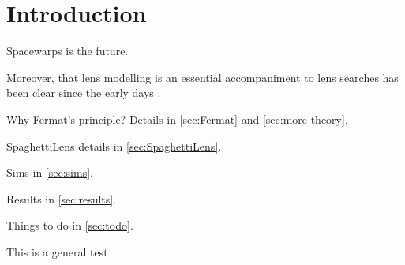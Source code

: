 \section{Introduction}

Spacewarps is the future.\todocit

Moreover, that lens modelling is an essential accompaniment to lens
searches has been clear since the early days \citep{1981ApJ...244..723Y}.

Why Fermat's principle?  Details in \ref{sec:Fermat} and
\ref{sec:more-theory}.

SpaghettiLens details in \ref{sec:SpaghettiLens}.

Sims in \ref{sec:sims}.

Results in \ref{sec:results}.

Things to do in \ref{sec:todo}.

This is a general test 


